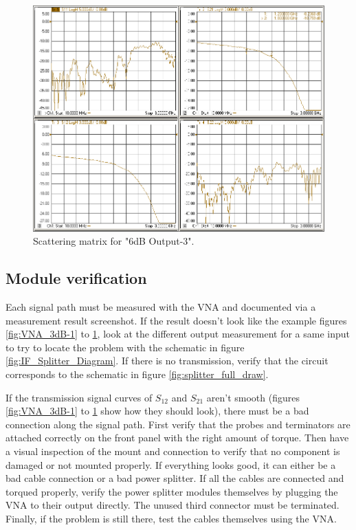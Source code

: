 \documentclass[12pt,a4paper,oneside]{article}
\begin{document}
%
%
\begin{figure}[H]
\centering
\includegraphics[width=0.9\linewidth]{figures/6dB-3.png}
\caption{Scattering matrix for "6dB Output-3".}
\label{fig:VNA_6dB-3}
\end{figure}
%

\subsection{Module verification}
\label{sec:Testing_Troubleshooting}
Each signal path must be measured with the VNA and documented via a measurement result screenshot. If the result doesn't look like the example figures \ref{fig:VNA_3dB-1} to \ref{fig:VNA_6dB-3}, look at the different output measurement for a same input to try to locate the problem with the schematic in figure \ref{fig:IF_Splitter_Diagram}. If there is no transmission, verify that the circuit corresponds to the schematic in figure \ref{fig:splitter_full_draw}. 

If the transmission signal curves of $S_{12}$ and $S_{21}$ aren't smooth (figures \ref{fig:VNA_3dB-1} to \ref{fig:VNA_6dB-3} show how they should look), there must be a bad connection along the signal path. First verify that the probes and terminators are attached correctly on the front panel with the right amount of torque. Then have a visual inspection of the mount and connection to verify that no component is damaged or not mounted properly. If everything looks good, it can either be a bad cable connection or a bad power splitter. If all the cables are connected and torqued properly, verify the power splitter modules themselves by plugging the VNA to their output directly. The unused third connector must be terminated. Finally, if the problem is still there, test the cables themselves using the VNA.
\newpage
 
\end{document}
